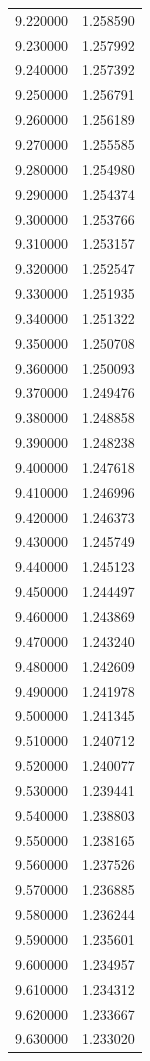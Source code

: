 \begin{tabular}{rr}
9.220000 & 1.258590 \\
9.230000 & 1.257992 \\
9.240000 & 1.257392 \\
9.250000 & 1.256791 \\
9.260000 & 1.256189 \\
9.270000 & 1.255585 \\
9.280000 & 1.254980 \\
9.290000 & 1.254374 \\
9.300000 & 1.253766 \\
9.310000 & 1.253157 \\
9.320000 & 1.252547 \\
9.330000 & 1.251935 \\
9.340000 & 1.251322 \\
9.350000 & 1.250708 \\
9.360000 & 1.250093 \\
9.370000 & 1.249476 \\
9.380000 & 1.248858 \\
9.390000 & 1.248238 \\
9.400000 & 1.247618 \\
9.410000 & 1.246996 \\
9.420000 & 1.246373 \\
9.430000 & 1.245749 \\
9.440000 & 1.245123 \\
9.450000 & 1.244497 \\
9.460000 & 1.243869 \\
9.470000 & 1.243240 \\
9.480000 & 1.242609 \\
9.490000 & 1.241978 \\
9.500000 & 1.241345 \\
9.510000 & 1.240712 \\
9.520000 & 1.240077 \\
9.530000 & 1.239441 \\
9.540000 & 1.238803 \\
9.550000 & 1.238165 \\
9.560000 & 1.237526 \\
9.570000 & 1.236885 \\
9.580000 & 1.236244 \\
9.590000 & 1.235601 \\
9.600000 & 1.234957 \\
9.610000 & 1.234312 \\
9.620000 & 1.233667 \\
9.630000 & 1.233020 \\

\end{tabular}
